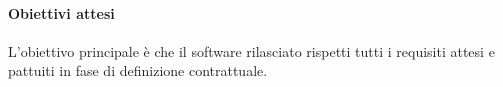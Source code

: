 	\paragraph{Obiettivi attesi}
	L'obiettivo principale è che il software rilasciato rispetti tutti i requisiti attesi e pattuiti in fase di definizione contrattuale.